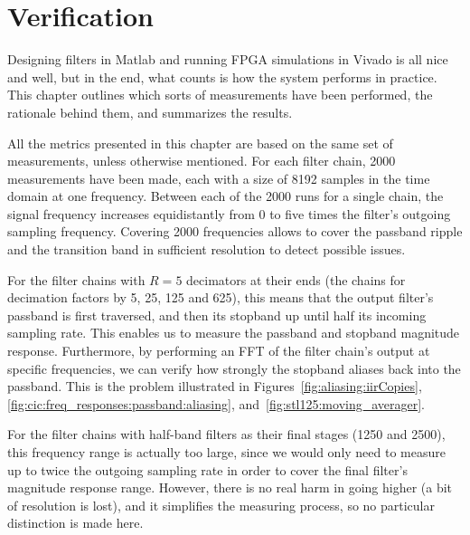 %
%
%
%
\chapter{Verification} %
\label{ch:verification}

Designing filters  in Matlab  and running  FPGA simulations  in Vivado  is all
nice  and well,  but  in the  end,  what  counts is  how  the system  performs
in  practice. This chapter  outlines  which sorts  of  measurements have  been
performed, the rationale behind them, and summarizes the results.

All  the metrics  presented in  this  chapter are  based  on the  same set  of
measurements, unless  otherwise mentioned. For  each filter  chain, \num{2000}
measurements have  been made, each  with a size  of \num{8192} samples  in the
time domain at one frequency. Between each of the \num{2000} runs for a single
chain, the signal frequency increases equidistantly from \num{0} to five times
the  filter's  outgoing  sampling frequency. Covering  \num{2000}  frequencies
allows to  cover the  passband ripple  and the  transition band  in sufficient
resolution to detect possible issues.

For the  filter chains  with $R=5$  decimators at their  ends (the  chains for
decimation factors by \num{5}, \num{25},  \num{125} and \num{625}), this means
that the output filter's passband is first traversed, and then its stopband up
until half its incoming sampling rate. This enables us to measure the passband
and  stopband magnitude  response. Furthermore, by  performing an  FFT of  the
filter chain's output at specific frequencies,  we can verify how strongly the
stopband aliases back into the passband. This is the problem illustrated in
Figures~\ref{fig:aliasing:iirCopies},
\ref{fig:cic:freq_responses:passband:aliasing},
and~\ref{fig:stl125:moving_averager}.

For the filter chains with half-band filters as their final stages (\num{1250}
and \num{2500}),  this frequency range is  actually too large, since  we would
only need to measure up to twice  the outgoing sampling rate in order to cover
the final filter's  magnitude response range.  However, there is  no real harm
in going higher (a bit of resolution is lost), and it simplifies the measuring
process, so no particular distinction is made here.

